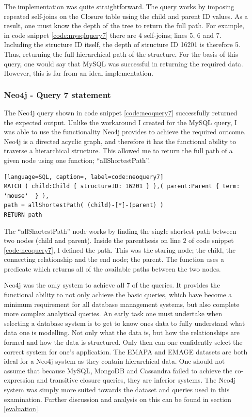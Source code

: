 The implementation was quite straightforward. The query works by imposing repeated self-joins on the Closure table using the child and parent ID values. As a result, one must know the depth of the tree to return the full path. For example, in code snippet \ref{code:mysqlquery7} there are 4 self-joins; lines 5, 6 and 7. Including the structure ID itself, the depth of structure ID 16201 is therefore 5. Thus, returning the full hierarchical path of the structure. For the basis of this query, one would say that MySQL was successful in returning the required data. However, this is far from an ideal implementation.

\subsubsection*{Neo4j - Query 7 statement}\label{neoquery7statement}
The Neo4j query shown in code snippet \ref{code:neoquery7} successfully returned the expected output. Unlike the workaround I created for the MySQL query, I was able to use the functionality Neo4j provides to achieve the required outcome. Neo4j is a directed acyclic graph, and therefore it has the functional ability to traverse a hierarchical structure. This allowed me to return the full path of a given node using one function; ``allShortestPath''. 

\begin{lstlisting}[language=SQL, caption=, label=code:neoquery7]
MATCH ( child:Child { structureID: 16201 } ),( parent:Parent { term: 'mouse'  } ),
path = allShortestPath( (child)-[*]-(parent) )
RETURN path
\end{lstlisting}

The ``allShortestPath'' node works by finding the single shortest path between two nodes (child and parent). Inside the parenthesis on line 2 of code snippet \ref{code:neoquery7}, I defined the path. This was the staring node; the child, the connecting relationship and the end node; the parent. The function uses a predicate which returns all of the available paths between the two nodes.

Neo4j was the only system to achieve all 7 of the queries. It provides the functional ability to not only achieve the basic queries, which have become a minimum requirement for all database management systems, but also complete more complex analytical queries. An early task one must undertake when selecting a database system is to get to know ones data to fully understand what data one is modelling. Not only what the data is, but how the relationships are formed and how the data is structured. Only then can one confidently select the correct system for one's application. The EMAPA and EMAGE datasets are both ideal for a Neo4j system as they contain hierarchical data. One should not assume that because MySQL, MongoDB and Cassandra failed to achieve the co-expression and transitive closure queries, they are inferior systems. The Neo4j system was simply more suited towards the dataset and queries used in this examination. Further discussion and analysis on this can be found in section \ref{evaluation}.